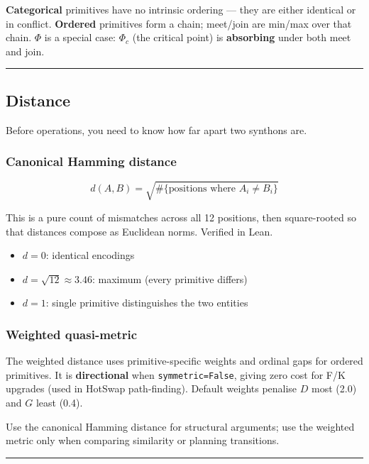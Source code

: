 \documentclass[11pt,a4paper]{article}
\begin{document}
\textbf{Categorical} primitives have no intrinsic ordering --- they are either identical or in conflict.
\textbf{Ordered} primitives form a chain; meet/join are min/max over that chain.
\textbf{$\Phi$} is a special case: $\Phi_c$ (the critical point) is \textbf{absorbing} under both meet and join.

\begin{center}
\rule{0.5\textwidth}{0.4pt}
\end{center}

\subsection{Distance}

Before operations, you need to know how far apart two synthons are.

\subsubsection{Canonical Hamming distance}

\[d(A, B) = \sqrt{\#\{\text{positions where } A_i \neq B_i\}}\]

This is a pure count of mismatches across all 12 positions, then square-rooted so that distances compose as Euclidean norms. Verified in Lean.

\begin{itemize}
    \item $d = 0$: identical encodings
    \item $d = \sqrt{12} \approx 3.46$: maximum (every primitive differs)
    \item $d = 1$: single primitive distinguishes the two entities
\end{itemize}

\subsubsection{Weighted quasi-metric}

The weighted distance uses primitive-specific weights and ordinal gaps for ordered primitives. It is \textbf{directional} when \texttt{symmetric=False}, giving zero cost for F/K upgrades (used in HotSwap path-finding). Default weights penalise $D$ most (2.0) and $G$ least (0.4).

Use the canonical Hamming distance for structural arguments; use the weighted metric only when comparing similarity or planning transitions.

\begin{center}
\rule{0.5\textwidth}{0.4pt}
\end{center}
\end{document}

